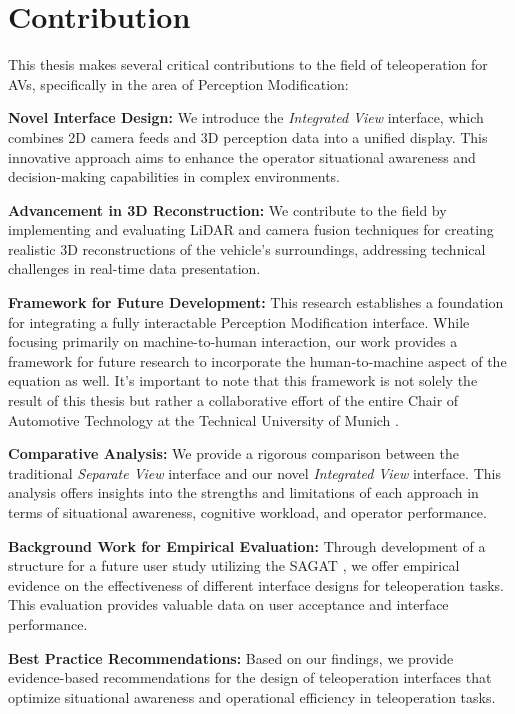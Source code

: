 \section{Contribution}
This thesis makes several critical contributions to the field of teleoperation for \acp{AV}, specifically in the area of Perception Modification:

\textbf{Novel Interface Design:}
We introduce the \emph{Integrated View} interface, which combines 2D camera feeds and 3D perception data into a unified display. This innovative approach
aims to enhance the operator situational awareness and decision-making capabilities in complex environments.

\textbf{Advancement in 3D Reconstruction:}
We contribute to the field by implementing and evaluating \ac{LiDAR} and camera fusion techniques for creating realistic 3D reconstructions of the vehicle's surroundings, addressing technical challenges in real-time data presentation.

\textbf{Framework for Future Development:}
This research establishes a foundation for
integrating a fully interactable Perception Modification interface. While focusing
primarily on machine-to-human interaction, our work provides a framework for future
research to incorporate the human-to-machine aspect of the equation as well. It's
important to note that this framework is not solely the result of this thesis but rather a collaborative effort of the entire Chair of Automotive Technology at the Technical
University of Munich \cite{tum_ftm}.

\textbf{Comparative Analysis:}
We provide a rigorous comparison between the traditional
\emph{Separate View} interface and our novel \emph{Integrated View} interface. This analysis offers
insights into the strengths and limitations of each approach in terms of situational
awareness, cognitive workload, and operator performance.

\textbf{Background Work for Empirical Evaluation:}
Through development of a structure for a future user study utilizing the \ac{SAGAT} \cite{endsley1988sagat}, we offer empirical evidence on the effectiveness of different interface designs for teleoperation tasks. This evaluation provides
valuable data on user acceptance and interface performance.

\textbf{Best Practice Recommendations:}
Based on our findings, we provide evidence-based recommendations for the design of teleoperation interfaces that optimize situational awareness and operational efficiency in teleoperation tasks.

